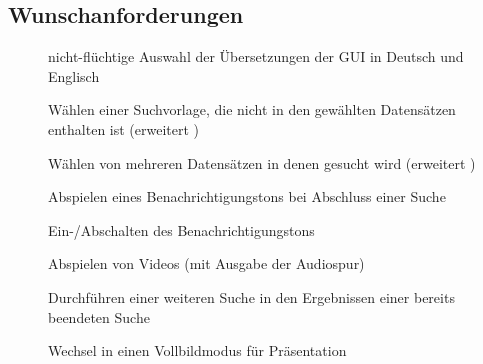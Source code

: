 \subsection{Wunschanforderungen}
\begin{description}
	\item[] nicht-flüchtige Auswahl der Übersetzungen der GUI in Deutsch und Englisch
	\newline
	\item[] Wählen einer Suchvorlage, die nicht in den gewählten Datensätzen enthalten ist (erweitert )
	\item[] Wählen von mehreren Datensätzen in denen gesucht wird (erweitert )
	\newline
	\item[] Abspielen eines Benachrichtigungstons bei Abschluss einer Suche
	\item[] Ein-/Abschalten des Benachrichtigungstons
	\item[] Abspielen von Videos (mit Ausgabe der Audiospur)
	\item[] Durchführen einer weiteren Suche in den Ergebnissen einer bereits beendeten Suche
	\newline
	\item[] Wechsel in einen Vollbildmodus für Präsentation
\end{description}
